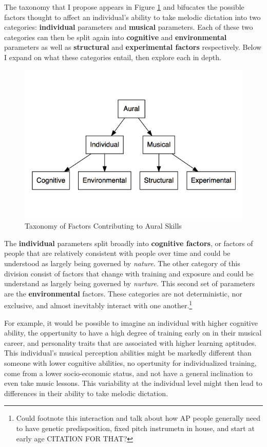 \documentclass[]{book}
\let\rmarkdownfootnote\footnote%
\def\footnote{\protect\rmarkdownfootnote}
\theoremstyle{definition}
\theoremstyle{definition}
\theoremstyle{definition}
\theoremstyle{remark}
\begin{document}
The taxonomy that I propose appears in Figure \ref{fig:taxonomy} and
bifucates the possible factors thought to affect an individual's ability
to take melodic dictation into two categories: \textbf{individual}
parameters and \textbf{musical} parameters. Each of these two categories
can then be split again into \textbf{cognitive} and
\textbf{environmental} parameters as well as \textbf{structural} and
\textbf{experimental factors} respectively. Below I expand on what these
categories entail, then explore each in depth.

\begin{figure}

{\centering \includegraphics[width=0.8\linewidth]{img/taxonomy4} 

}

\caption{Taxonomy of Factors Contributing to Aural Skills}\label{fig:taxonomy}
\end{figure}

The \textbf{individual} parameters split broadly into \textbf{cognitive
factors}, or factors of people that are relatively consistent with
people over time and could be understood as largely being governed by
\emph{nature}. The other category of this division consist of factors
that change with training and exposure and could be understand as
largely being governed by \emph{nurture}. This second set of parameters
are the \textbf{environmental} factors. These categories are not
deterministic, nor exclusive, and almost inevitably interact with one
another.\footnote{Could footnote this interaction and talk about how AP
  people generally need to have genetic predisposition, fixed pitch
  instrumetn in house, and start at early age CITATION FOR THAT?}

For example, it would be possible to imagine an individual with higher
cognitive ability, the oppertunity to have a high degree of training
early on in their musical career, and personality traits that are
associated with higher learning aptitudes. This individual's musical
perception abilities might be markedly different than someone with lower
cognitive abilities, no opertunity for individualized training, come
from a lower socio-economic status, and not have a general inclination
to even take music lessons. This variability at the individual level
might then lead to differences in their ability to take melodic
dictation.
\end{document}
